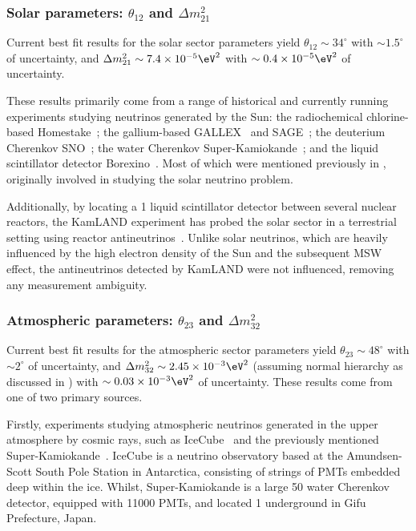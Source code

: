 \subsubsection*{Solar parameters: $\theta_{12}$ and $\Delta m^{2}_{21}$} %

Current best fit results for the solar sector parameters yield $\theta_{12}\sim34^{\circ}$ with
$\sim1.5^{\circ}$ of uncertainty, and $\Delta m^{2}_{21}\sim7.4\times10^{-5}\eV^{2}$ with
$\sim0.4\times10^{-5}\eV^{2}$ of uncertainty.

These results primarily come from a range of historical and currently running experiments studying
neutrinos generated by the Sun: the radiochemical chlorine-based Homestake~\cite{cleveland1998};
the gallium-based GALLEX~\cite{kaether2010} and SAGE~\cite{abdurashitov2009}; the deuterium
Cherenkov SNO~\cite{maneira2011}; the water Cherenkov Super-Kamiokande~\cite{hosaka2006,
cravens2008, abe2011_super, nakano2017}; and the liquid scintillator detector
Borexino~\cite{bellini2011, bellini2010, bellini2014}. Most of which were mentioned previously in
, originally involved in studying the solar neutrino problem.

Additionally, by locating a \SI{1}{} liquid scintillator detector between several nuclear
reactors, the KamLAND experiment has probed the solar sector in a terrestrial setting using
reactor antineutrinos~\cite{gando2011}. Unlike solar neutrinos, which are heavily influenced by
the high electron density of the Sun and the subsequent MSW effect, the antineutrinos detected by
KamLAND were not influenced, removing any measurement ambiguity.

\subsubsection*{Atmospheric parameters: $\theta_{23}$ and $\Delta m^{2}_{32}$} %

Current best fit results for the atmospheric sector parameters yield $\theta_{23}\sim48^{\circ}$
with $\sim2^{\circ}$ of uncertainty, and $\Delta m^{2}_{32}\sim2.45\times10^{-3}\eV^{2}$ (assuming
normal hierarchy as discussed in ) with
$\sim0.03\times10^{-3}\eV^{2}$ of uncertainty. These results come from one of two primary sources.

Firstly, experiments studying atmospheric neutrinos generated in the upper atmosphere by cosmic
rays, such as IceCube~\cite{karle2003, aartsen2015} and the previously mentioned
Super-Kamiokande~\cite{abe2018}. IceCube is a neutrino observatory based at the Amundsen-Scott
South Pole Station in Antarctica, consisting of strings of PMTs embedded deep within the ice.
Whilst, Super-Kamiokande is a large \SI{50}{} water Cherenkov detector, equipped with
11000 PMTs, and located \SI{1}{} underground in Gifu Prefecture, Japan.

